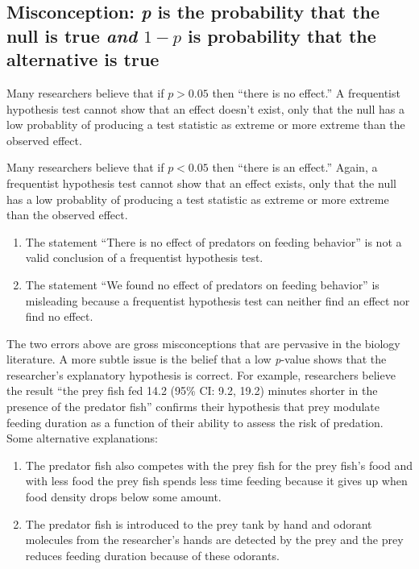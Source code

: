 \documentclass[]{book}
\providecommand{\tightlist}{%
  \setlength{\itemsep}{0pt}\setlength{\parskip}{0pt}}
\begin{document}
\hypertarget{misconception-p-is-the-probability-that-the-null-is-true-and-1-p-is-probability-that-the-alternative-is-true}{%
\subsection{\texorpdfstring{Misconception: \emph{p} is the probability that the null is true \emph{and} \(1-p\) is probability that the alternative is true}{Misconception: p is the probability that the null is true and 1-p is probability that the alternative is true}}\label{misconception-p-is-the-probability-that-the-null-is-true-and-1-p-is-probability-that-the-alternative-is-true}}

Many researchers believe that if \(p > 0.05\) then ``there is no effect.'' A frequentist hypothesis test cannot show that an effect doesn't exist, only that the null has a low probablity of producing a test statistic as extreme or more extreme than the observed effect.

Many researchers believe that if \(p < 0.05\) then ``there is an effect.'' Again, a frequentist hypothesis test cannot show that an effect exists, only that the null has a low probablity of producing a test statistic as extreme or more extreme than the observed effect.

\begin{enumerate}
\def\labelenumi{\arabic{enumi}.}
\tightlist
\item
  The statement ``There is no effect of predators on feeding behavior'' is not a valid conclusion of a frequentist hypothesis test.
\item
  The statement ``We found no effect of predators on feeding behavior'' is misleading because a frequentist hypothesis test can neither find an effect nor find no effect.
\end{enumerate}

The two errors above are gross misconceptions that are pervasive in the biology literature. A more subtle issue is the belief that a low \emph{p}-value shows that the researcher's explanatory hypothesis is correct. For example, researchers believe the result ``the prey fish fed 14.2 (95\% CI: 9.2, 19.2) minutes shorter in the presence of the predator fish'' confirms their hypothesis that prey modulate feeding duration as a function of their ability to assess the risk of predation. Some alternative explanations:

\begin{enumerate}
\def\labelenumi{\arabic{enumi}.}
\tightlist
\item
  The predator fish also competes with the prey fish for the prey fish's food and with less food the prey fish spends less time feeding because it gives up when food density drops below some amount.
\item
  The predator fish is introduced to the prey tank by hand and odorant molecules from the researcher's hands are detected by the prey and the prey reduces feeding duration because of these odorants.
\end{enumerate}
\end{document}
